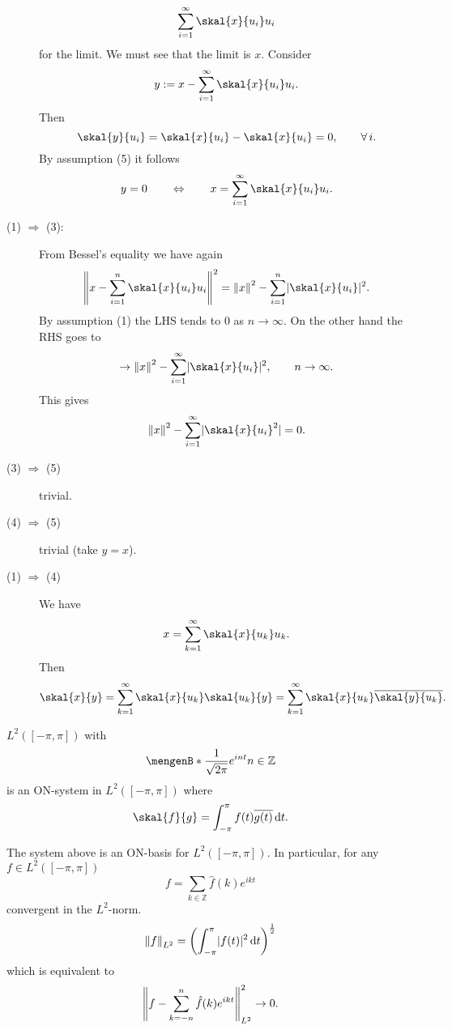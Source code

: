 \begin{beweis}
\begin{description}
		\[
			\sum_{i=1}^{\infty} \skal{x}{u_i}u_i 
		\]
		for the limit. We must see that the limit is $x$. Consider
		\[
			y := x - \sum_{i=1}^{\infty} \skal{x}{u_i}u_i.
		\]
		Then 
		\[
			\skal{y}{u_i} = \skal{x}{u_i} - \skal{x}{u_i} = 0, \qquad \forall\, i.
		\]
		By assumption (5) it follows 
		\[
			y = 0 \qquad \Leftrightarrow \qquad x = \sum^{\infty}_{i=1} \skal{x}{u_i}u_i.
		\]
		\item[(1) $\Rightarrow$ (3):] From Bessel's equality we have again
		\[
			\norm{x- \sum^{n}_{i=1}\skal{x}{u_i}u_i}^2 = \norm{x}^2 - \sum^{n}_{i=1}\abs{\skal{x}{u_i}}^2.
		\] 
		By assumption (1) the LHS tends to $0$ as $n \to \infty$. On the other hand the RHS goes to 
		\[
			\to \norm{x}^2 - \sum^{\infty}_{i=1} \abs{\skal{x}{u_i}}^2, \qquad n \to \infty.
		\]
		This gives 
		\[
			\norm{x}^2 - \sum_{i=1}^{\infty} \abs{\skal{x}{u_i}^2} = 0.
		\]
		\item[(3) $\Rightarrow $ (5)] trivial.
		\item[(4) $\Rightarrow $ (5)] trivial (take $y=x$).
		\item[(1) $\Rightarrow $ (4)] We have
		\[
			x = \sum_{k=1}^{\infty} \skal{x}{u_k}u_k.
		\]
		Then
		\[
			\skal{x}{y} = \sum_{k=1}^{\infty} \skal{x}{u_k}\skal{u_k}{y} = \sum_{k=1}^{\infty}\skal{x}{u_k}\overline{\skal{y}{u_k}}.
		\]
 	\end{description}
\end{beweis}

\begin{beispiel}
	$L^2([- \pi, \pi])$ with
	\[
		\set[\frac{1}{\sqrt{2\pi}}e ^{int}]{n \in \mathbb{Z}}
	\]
	is an ON-system in $L^2([-\pi, \pi])$ where
	\[
		\skal{f}{g} = \int_{-\pi}^{\pi} f(t) \overline{g(t)} \,\mathrm{d}t.
	\]
\end{beispiel}

\begin{satz}
	The system above is an ON-basis for $L^2([-\pi,\pi])$. In particular, for any $f \in L^2([-\pi,\pi])$
	\[
		f = \sum_{k \in \mathbb{Z}}^{} \hat f(k) e^{ikt}
	\]
	convergent in the $L^2$-norm.
	\[
		\norm{f}_{L^2} = \left( \int_{-\pi}^{\pi} \abs{f(t)}^2 \,\mathrm{d}t \right)^{\frac{1}{2}}
	\]
	which is equivalent to
	\[
		\norm{f - \sum_{k=-n}^{n} \hat f(k) e^{ikt}}^2_{L^2} \to 0.
	\]
\end{satz}



